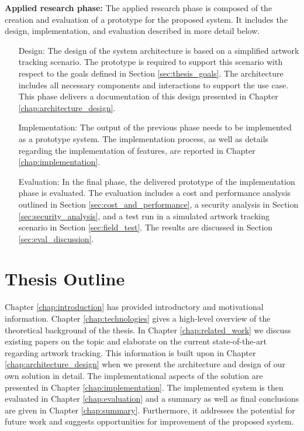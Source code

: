 \textbf{Applied research phase:} The applied research phase is composed of the creation and evaluation of a prototype for the proposed system. It includes the design, implementation, and evaluation described in more detail below.

\begin{itemize}[font=\itshape, align=left, itemindent=0.5cm]
    \item[Design:] The design of the system architecture is based on a simplified artwork tracking scenario. The prototype is required to support this scenario with respect to the goals defined in Section \ref{sec:thesis_goals}. The architecture includes all necessary components and interactions to support the use case. This phase delivers a documentation of this design presented in Chapter \ref{chap:architecture_design}.
    \item[Implementation:] The output of the previous phase needs to be implemented as a prototype system. The implementation process, as well as details regarding the implementation of features, are reported in Chapter \ref{chap:implementation}. 
    \item[Evaluation:] In the final phase, the delivered prototype of the implementation phase is evaluated. The evaluation includes a cost and performance analysis outlined in Section \ref{sec:cost_and_performance}, a security analysis in Section \ref{sec:security_analysis}, and a test run in a simulated artwork tracking scenario in Section \ref{sec:field_test}. The results are discussed in Section \ref{sec:eval_discussion}.
\end{itemize}


\section{Thesis Outline}
Chapter \ref{chap:introduction} has provided introductory and motivational information. Chapter \ref{chap:technologies} gives a high-level overview of the theoretical background of the thesis. In Chapter \ref{chap:related_work} we discuss existing papers on the topic and elaborate on the current state-of-the-art regarding artwork tracking. This information is built upon in Chapter \ref{chap:architecture_design} when we present the architecture and design of our own solution in detail. The implementational aspects of the solution are presented in Chapter \ref{chap:implementation}. The implemented system is then evaluated in Chapter \ref{chap:evaluation} and a summary as well as final conclusions are given in Chapter \ref{chap:summary}. Furthermore, it addresses the potential for future work and suggests opportunities for improvement of the proposed system.
